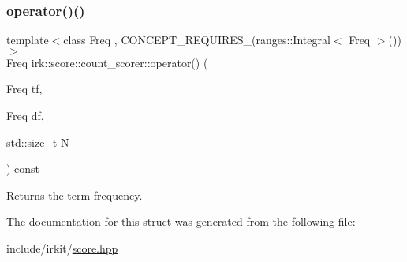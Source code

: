 \subsubsection{\texorpdfstring{operator()()}{operator()()}}
{\footnotesize\ttfamily template$<$class Freq , C\+O\+N\+C\+E\+P\+T\+\_\+\+R\+E\+Q\+U\+I\+R\+E\+S\+\_\+(ranges\+::\+Integral$<$ Freq $>$()) $>$ \\
Freq irk\+::score\+::count\+\_\+scorer\+::operator() (\begin{DoxyParamCaption}\item[{Freq}]{tf,  }\item[{Freq}]{df,  }\item[{std\+::size\+\_\+t}]{N }\end{DoxyParamCaption}) const\hspace{0.3cm}{\ttfamily [inline]}}



Returns the term frequency. 



The documentation for this struct was generated from the following file\+:\begin{DoxyCompactItemize}
\item 
include/irkit/\mbox{\hyperlink{score_8hpp}{score.\+hpp}}\end{DoxyCompactItemize}
